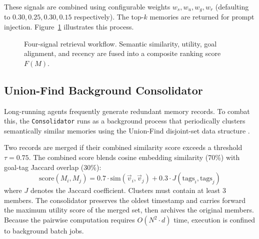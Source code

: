 \documentclass[conference]{IEEEtran}
\begin{document}
These signals are combined using configurable weights $w_s, w_u, w_g, w_r$ (defaulting to $0.30, 0.25, 0.30, 0.15$ respectively). The top-$k$ memories are returned for prompt injection. Figure~\ref{fig:retrieval_flow} illustrates this process.

\begin{figure}[htbp]
\centering
{}
\caption{Four-signal retrieval workflow. Semantic similarity, utility, goal alignment, and recency are fused into a composite ranking score $F(M)$.}
\label{fig:retrieval_flow}
\end{figure}

\subsection{Union-Find Background Consolidator}
Long-running agents frequently generate redundant memory records. To combat this, the \texttt{Consolidator} runs as a background process that periodically clusters semantically similar memories using the Union-Find disjoint-set data structure \cite{tarjan1975uf}.

Two records are merged if their combined similarity score exceeds a threshold $\tau = 0.75$. The combined score blends cosine embedding similarity (70\%) with goal-tag Jaccard overlap (30\%):
\begin{equation}
\label{eq:consolidation_score}
\text{score}(M_i, M_j) = 0.7 \cdot \text{sim}(\vec{v}_i, \vec{v}_j) + 0.3 \cdot J(\text{tags}_i, \text{tags}_j)
\end{equation}
where $J$ denotes the Jaccard coefficient. Clusters must contain at least 3 members. The consolidator preserves the oldest timestamp and carries forward the maximum utility score of the merged set, then archives the original members. Because the pairwise computation requires $O(N^2 \cdot d)$ time, execution is confined to background batch jobs.
\end{document}
